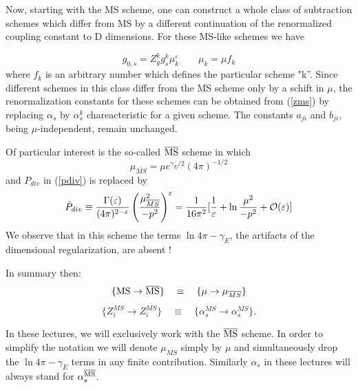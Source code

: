 \documentclass[12pt,rotate]{article}
\newcommand{\ord}{{\cal O}}
\begin{document}
\begin{itemize}
Now, starting with the MS scheme, one can construct a whole class
of subtraction schemes which differ from MS by a different continuation
of the renormalized coupling constant to D dimensions. For these
MS-like schemes we have

\begin{equation}
g_{0,s}=Z^k_g g^k_s \mu^\varepsilon_k
\qquad
\mu_k=\mu f_k
\end{equation}
where $f_k$ is an arbitrary number which defines the particular
scheme "k''. Since different schemes in this class differ from the
MS scheme only by a schift in $\mu$, the renormalization constants
for these schemes can be obtained from (\ref{zms}) by replacing
$\alpha_s$ by $\alpha^k_s$ chareacteristic for a given scheme.
The constants $a_{ji}$ and $b_{ji}$, being $\mu$-independent,
remain unchanged.

Of particular interest is the so-called  $\overline{\rm MS}$ scheme
\cite{BBDM} in which
\begin{equation}\label{msms}
\mu_{\overline{MS}}=\mu e^{\gamma_E/2}(4\pi)^{-1/2}
\end{equation}
and $P_{div}$ in (\ref{pdiv}) is replaced by
\begin{equation}\label{pdivb}
\bar P_{div}\equiv \frac{\Gamma(\varepsilon)}{(4\pi)^{2-\varepsilon}}
\left(\frac{\mu^2_{\overline{MS}}}{-p^2}\right)^\varepsilon
=\frac{1}{16\pi^2}
\lbrack \frac{1}{\varepsilon}+\ln\frac{\mu^2}{-p^2}
+\ord(\varepsilon)
\rbrack
\end{equation}
We observe that in this scheme the terms $\ln 4\pi-\gamma_E$,
the artifacts of the dimensional regularization, are absent !

In summary then:
\begin{equation}
\lbrace{\rm MS \to \overline{MS} }\rbrace\quad 
\equiv\quad \lbrace{\mu\to\mu_{\overline{MS}}}\rbrace
\end{equation}
\begin{equation}
\lbrace Z_i^{{MS}} \to Z_i^{\overline{MS}}\rbrace\quad \equiv\quad
\lbrace\alpha_s^{MS} \to \alpha_s^{\overline{MS}}\rbrace.
\end{equation}

In these lectures, we will exclusively work with the $\overline{\rm MS}$
scheme. In order to simplify the notation we will denote
$\mu_{\overline{MS}}$ simply by $\mu$ and simultaneously drop
the $\ln 4 \pi-\gamma_E$ terms in any finite contribution. Similarly
$\alpha_s$ in these lectures will always stand for 
$ \alpha_s^{\overline{\rm MS}}$.


\end{itemize}
\end{document}
